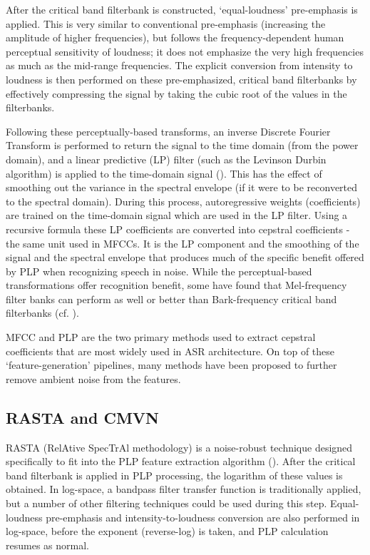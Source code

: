After the critical band filterbank is constructed, `equal-loudness' pre-emphasis is applied.  This is very similar to conventional pre-emphasis (increasing the amplitude of higher frequencies), but follows the frequency-dependent human perceptual sensitivity of loudness; it does not emphasize the very high frequencies as much as the mid-range frequencies. %
The explicit conversion from intensity to loudness is then performed on these pre-emphasized, critical band filterbanks by effectively compressing the signal by taking the cubic root of the values in the filterbanks.

Following these perceptually-based transforms, an inverse Discrete Fourier Transform is performed to return the signal to the time domain (from the power domain), and a linear predictive (LP) filter (such as the Levinson Durbin algorithm) is applied to the time-domain signal (\cite{gold:11}).  This has the effect of smoothing out the variance in the spectral envelope (if it were to be reconverted to the spectral domain).  During this process, autoregressive weights (coefficients) are trained on the time-domain signal which are used in the LP filter.  Using a recursive formula these LP coefficients are converted into cepstral coefficients - the same unit used in MFCCs.  It is the LP component and the smoothing of the signal and the spectral envelope that produces much of the specific benefit offered by PLP when recognizing speech in noise.  While the perceptual-based transformations offer recognition benefit, some have found that Mel-frequency filter banks can perform as well or better than Bark-frequency critical band filterbanks (cf. \cite{honig:05}).

MFCC and PLP are the two primary methods used to extract cepstral coefficients that are most widely used in ASR architecture.  On top of these `feature-generation' pipelines, many methods have been proposed to further remove ambient noise from the features.

\subsection{RASTA and CMVN}\label{sec:rasta_cmvn}

RASTA (RelAtive SpecTrAl methodology) is a noise-robust technique designed specifically to fit into the PLP feature extraction algorithm (\cite{hermansky:92}).  After the critical band filterbank is applied in PLP processing, the logarithm of these values is obtained.  In log-space, a bandpass filter transfer function is traditionally applied, but a number of other filtering techniques could be used during this step.  Equal-loudness pre-emphasis and intensity-to-loudness conversion are also performed in log-space, before the exponent (reverse-log) is taken, and PLP calculation resumes as normal.

